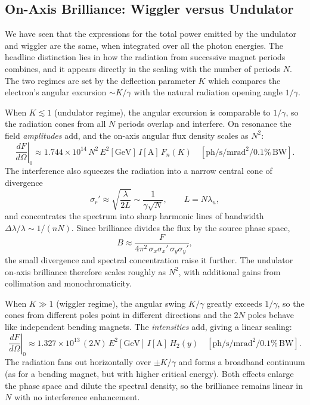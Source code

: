 \documentclass[11pt,a4paper]{article}
\begin{document}
\subsection{On-Axis Brilliance: Wiggler versus Undulator}

We have seen that the expressions for the total power emitted by the undulator
and wiggler are the same, when integrated over all the photon energies.
The headline distinction lies in how the radiation from successive magnet
periods combines, and it appears directly in the scaling with the number of
periods $N$. The two regimes are set by the deflection parameter $K$
which compares the electron's angular excursion $\sim K/\gamma$ with the natural
radiation opening angle $1/\gamma$.

When $K \lesssim 1$ (undulator regime), the angular excursion is comparable to $1/\gamma$, so the
radiation cones from all $N$ periods overlap and interfere. On resonance the
field \emph{amplitudes} add, and the on-axis angular flux density scales as
$N^2$:
%
\begin{equation}
  \left.\frac{dF}{d\Omega}\right|_{0}
  \approx 1.744\times10^{14}\, N^2 \, E^2[\mathrm{GeV}]\, I[\mathrm{A}]\, F_n(K)
  \quad [\mathrm{ph/s/mrad^2/0.1\%\,BW}].
\end{equation}
%
The interference also squeezes the radiation into a narrow central cone of
divergence
%
\begin{equation}
  \sigma_r' \approx \sqrt{\frac{\lambda}{2L}} \sim \frac{1}{\gamma\sqrt{N}},
  \qquad L = N\lambda_u,
\end{equation}
%
and concentrates the spectrum into sharp harmonic lines of bandwidth
$\Delta\lambda/\lambda \sim 1/(nN)$. Since brilliance divides the flux by the
source phase space,
%
\begin{equation}
  B \approx \frac{F}{4\pi^2\, \sigma_x \sigma_x' \, \sigma_y \sigma_y'},
\end{equation}
%
the small divergence and spectral concentration raise it further. The undulator
on-axis brilliance therefore scales roughly as $N^2$, with additional gains from
collimation and monochromaticity.

When $K \gg 1$ (wiggler regime), the angular swing $K/\gamma$ greatly exceeds $1/\gamma$, so the
cones from different poles point in different directions and the $2N$ poles
behave like independent bending magnets. The \emph{intensities} add, giving a
linear scaling:
%
\begin{equation}
  \left.\frac{dF}{d\Omega}\right|_{0}
  \approx 1.327\times10^{13}\, (2N)\, E^2[\mathrm{GeV}]\, I[\mathrm{A}]\, H_2(y)
  \quad [\mathrm{ph/s/mrad^2/0.1\%\,BW}].
\end{equation}
%
The radiation fans out horizontally over $\pm K/\gamma$ and forms a broadband
continuum (as for a bending magnet, but with higher critical energy). Both
effects enlarge the phase space and dilute the spectral density, so the
brilliance remains linear in $N$ with no interference enhancement.
\end{document}
